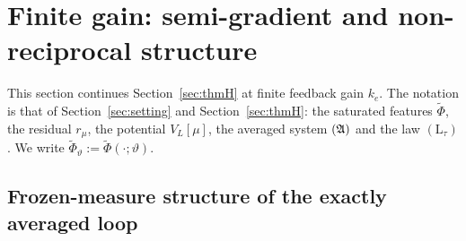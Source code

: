 \section{Finite gain: semi-gradient and non-reciprocal structure}\label{sec:finitegain}

This section continues Section~\ref{sec:thmH} at finite feedback gain $k_e$. The notation is that of
Section~\ref{sec:setting} and Section~\ref{sec:thmH}: the saturated features $\tilde\Phi$, the residual $r_\mu$, the
potential $V_L[\mu]$, the averaged system $(\mathfrak{A})$ and the law $(\mathrm{L}_\tau)$. We write
$\tilde\Phi_\vartheta := \tilde\Phi(\cdot;\vartheta)$.

\subsection{Frozen-measure structure of the exactly averaged loop}


